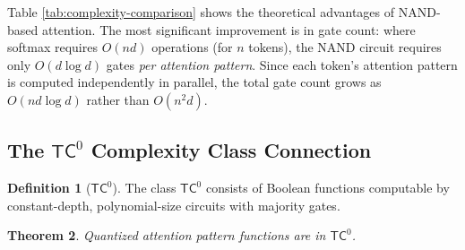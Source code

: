 \documentclass[11pt]{article}
\newtheorem{theorem}{Theorem}[section]
\theoremstyle{definition}
\newtheorem{definition}[theorem]{Definition}
\begin{document}
Table \ref{tab:complexity-comparison} shows the theoretical advantages of NAND-based attention. The most significant improvement is in gate count: where softmax requires $O(nd)$ operations (for $n$ tokens), the NAND circuit requires only $O(d \log d)$ gates \emph{per attention pattern}. Since each token's attention pattern is computed independently in parallel, the total gate count grows as $O(nd \log d)$ rather than $O(n^2 d)$.













\subsection{The $\mathsf{TC}^0$ Complexity Class Connection}













\begin{definition}[$\mathsf{TC}^0$]






The class $\mathsf{TC}^0$ consists of Boolean functions computable by constant-depth, polynomial-size circuits with majority gates.






\end{definition}













\begin{theorem}






Quantized attention pattern functions are in $\mathsf{TC}^0$.






\end{theorem}
\end{document}
